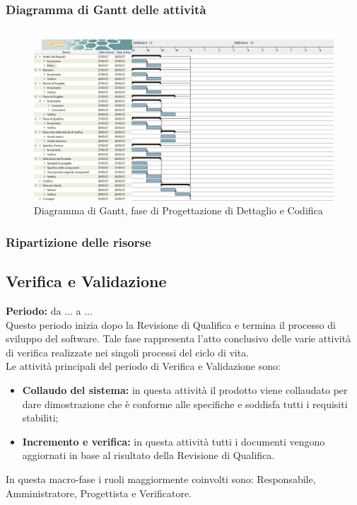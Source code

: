 	\subsubsection{Diagramma di Gantt delle attività}
	\begin{figure}[H]
		\centering
		\includegraphics[scale=0.30]{immagini/gantt/progettazione_dettaglio_codifica.png}
		\caption{Diagramma di Gantt, fase di Progettazione di Dettaglio e Codifica}
	\end{figure}
	\subsubsection{Ripartizione delle risorse}
	\subsection{Verifica e Validazione}
	\textbf{Periodo:} da ... a ... \\
	Questo periodo inizia dopo la Revisione di Qualifica e termina il processo di sviluppo del software. Tale fase rappresenta l'atto conclusivo delle varie attività di verifica realizzate nei singoli processi del ciclo di vita. \\
	Le attività principali del periodo di Verifica e Validazione sono: \\
	\begin{itemize}
		\item \textbf{Collaudo del sistema:} in questa attività il prodotto viene collaudato per dare
dimostrazione che è conforme alle specifiche e soddisfa tutti i requisiti stabiliti; \\
		\item \textbf{Incremento e verifica:} in questa attività tutti i documenti vengono aggiornati in base al risultato della Revisione di Qualifica. \\
	\end{itemize}
	In questa macro-fase i ruoli maggiormente coinvolti sono: Responsabile, Amministratore, Progettista e Verificatore.
